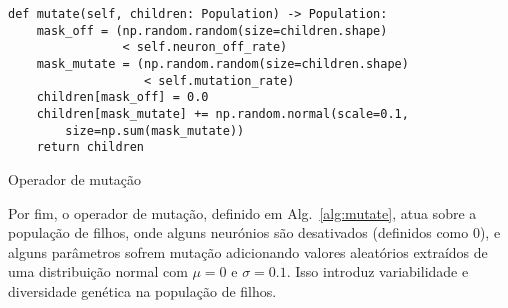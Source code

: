 \begin{listing}[!ht]
    \begin{verbatim}
def mutate(self, children: Population) -> Population:
    mask_off = (np.random.random(size=children.shape) 
                < self.neuron_off_rate)
    mask_mutate = (np.random.random(size=children.shape) 
                   < self.mutation_rate)
    children[mask_off] = 0.0
    children[mask_mutate] += np.random.normal(scale=0.1, 
        size=np.sum(mask_mutate))
    return children
    \end{verbatim}
    \caption{Operador de mutação}
    \label{alg:mutate}
\end{listing}

Por fim, o operador de mutação, definido em Alg.~\ref{alg:mutate}, atua sobre a população de filhos, onde alguns neurónios são desativados (definidos como 0), e alguns parâmetros sofrem mutação adicionando valores aleatórios extraídos de uma distribuição normal com $\mu=0$ e $\sigma=0.1$.
Isso introduz variabilidade e diversidade genética na população de filhos.